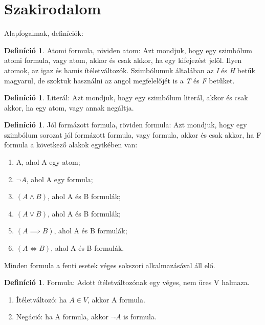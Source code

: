 \documentclass[
]{thesis-ekf}
\theoremstyle{definition}
\newtheorem{definicio}[tetel]{Definíció}
\theoremstyle{remark}
\begin{document}
	\section{Szakirodalom}

	Alapfogalmak, definíciók:
	
	\begin{definicio}
		Atomi formula, röviden atom:  Azt mondjuk, hogy egy szimbólum atomi formula, vagy atom, akkor és csak akkor, ha egy kifejezést jelöl. Ilyen atomok, az igaz és hamis ítéletváltozók. Szimbólumuk általában az \emph{I} és \emph{H} betűk magyarul, de szoktuk használni az angol megfelelőjét is a \emph{T} és \emph{F} betűket.
	\end{definicio}

	\begin{definicio}
		Literál: Azt mondjuk, hogy egy szimbólum literál, akkor és csak akkor, ha egy atom, vagy annak negáltja.
	\end{definicio}

	\begin{definicio}		
		Jól formázott formula, röviden formula: Azt mondjuk, hogy egy szimbólum sorozat jól formázott formula, vagy formula, akkor és csak akkor, ha F formula a következő alakok egyikében van:
		\begin{enumerate}[label=\textit{(\alph*)}]
			\item A, ahol A egy atom;
			\item $ \neg A $, ahol A egy formula;
			\item $ (A \wedge B) $, ahol A és B formulák;
			\item $ (A \vee B) $, ahol A és B formulák;
			\item $ (A \implies B) $, ahol A és B formulák;
			\item $ (A \Leftrightarrow B) $, ahol A és B formulák.
		\end{enumerate}
		Minden formula a fenti esetek véges sokszori alkalmazásával áll elő.
	\end{definicio}

	\begin{definicio}
		Formula: Adott ítéletváltozónak egy véges, nem üres V halmaza.
		\begin{enumerate}
			\item Ítéletváltozó: ha $ A\in V $, akkor A formula.
			\item Negáció: ha A formula, akkor $\neg A $ is formula.
		\end{enumerate}
	\end{definicio}
\end{document}
